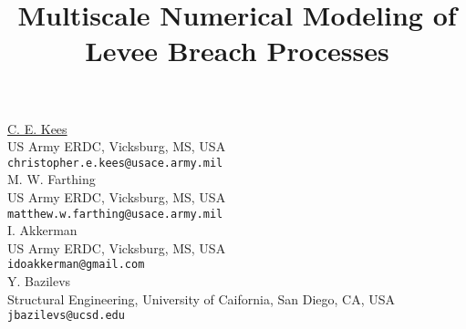 


\title{Multiscale Numerical Modeling of Levee Breach Processes}
\author{} \institute{} %
\maketitle
\begin{center}
{\large \underline{C. E. Kees}}\\
US Army ERDC, Vicksburg, MS, USA\\
{\tt christopher.e.kees@usace.army.mil}\\
\vspace{4mm} %
{\large M. W. Farthing}\\
US Army ERDC, Vicksburg, MS, USA\\
{\tt matthew.w.farthing@usace.army.mil}\\
\vspace{4mm} %
{\large I. Akkerman}\\
US Army ERDC, Vicksburg, MS, USA\\
{\tt idoakkerman@gmail.com}\\
\vspace{4mm} %
{\large Y. Bazilevs}\\
Structural Engineering, University of Caifornia, San Diego, CA, USA\\
{\tt jbazilevs@ucsd.edu}\\
\end{center}

